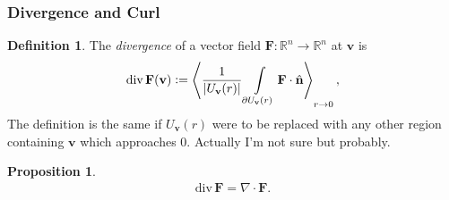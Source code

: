 \documentclass{article}
\newcommand{\vc}{\vcentcolon}
\theoremstyle{definition}
\newtheorem{defn}{Definition}[subsubsection]
\newtheorem{prop}{Proposition}[subsubsection]
\begin{document}
\newpage
\subsubsection{Divergence and Curl}
\begin{defn}
	The \emph{divergence} of a vector field $\mathbf{F}:\mathbb{R}^n\rightarrow\mathbb{R}^n$ at $\mathbf{v}$ is
	\begin{align*}
		\text{div}\,\mathbf{F}(\mathbf{v})\vc=\left\langle\frac{1}{\lvert U_{\mathbf{v}}(r)\rvert}\int\limits_{\partial U_{\mathbf{v}}(r)}\mathbf{F}\cdot\hat{\mathbf{n}}\right\rangle_{r\rightarrow0},
	\end{align*}
	The definition is the same if $U_{\mathbf{v}}(r)$ were to be replaced with any other region containing $\mathbf{v}$ which approaches 0. Actually I'm not sure but probably.
\end{defn}
\begin{prop}
	\begin{align*}
		\text{div}\,\mathbf{F}=\nabla\cdot\mathbf{F}.
	\end{align*}
\end{prop}
\end{document}
